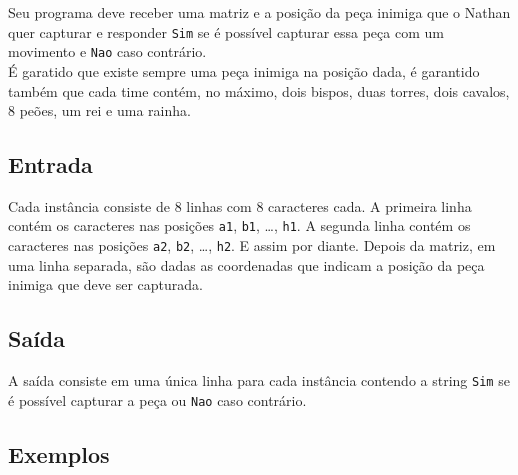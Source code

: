 Seu programa deve receber uma matriz e a posição da peça inimiga que o Nathan quer capturar e responder \texttt{Sim} se é possível capturar essa peça com um movimento e \texttt{Nao} caso contrário. \\
É garatido que existe sempre uma peça inimiga na posição dada, é garantido também que cada time contém, no máximo, dois bispos, duas torres, dois cavalos, 8 peões, um rei e uma rainha. \\


\subsection*{Entrada}
\textoDiversasInstanciasEOF

Cada instância consiste de 8 linhas com 8 caracteres cada. A primeira linha contém os caracteres nas posições \texttt{a1}, \texttt{b1}, \dots, \texttt{h1}. A segunda linha contém os caracteres nas posições \texttt{a2}, \texttt{b2}, \dots, \texttt{h2}. E assim por diante. Depois da matriz, em uma linha separada, são dadas as coordenadas que indicam a posição da peça inimiga que deve ser capturada. \\


\subsection*{Saída}

A saída consiste em uma única linha para cada instância contendo a string \texttt{Sim} se é possível capturar a peça ou \texttt{Nao} caso contrário.


\subsection*{Exemplos}

